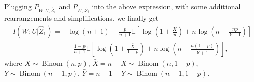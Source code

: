 \documentclass[onecolumn,romanappendices,10pt]{IEEEtran}
\newcommand{\EE}{{\mathbb{E}}}
\DeclareMathOperator{\Binomial}{Binom}
\begin{document}
	Plugging $P_{W, U, \hat{Z}_{i}}$ and $P_{W, \hat{Z}_{i}}$ into the above expression, with some additional rearrangements and simplifications, we finally get
	\begin{equation}
		\begin{aligned}
			I\left( W; U | \hat{Z}_{1} \right) =& \log (n + 1) - \frac{p}{n + 1} \EE \left[ \log \left( 1 + \frac{X}{p} \right) + n \log \left( n + \frac{n p}{Y + 1} \right) \right] \\
			&- \frac{1 - p}{n + 1} \EE \left[ \log \left( 1 + \frac{\bar{X}}{1 - p} \right) + n \log \left( n + \frac{n (1 - p)}{\bar{Y} + 1} \right) \right],
		\end{aligned}
		\label{eq:Ber_LOO_SCMI}
	\end{equation}
	where $X \sim \Binomial(n, p)$, $\bar{X} = n - X \sim \Binomial(n, 1 - p)$, $Y \sim \Binomial(n - 1, p)$, $\bar{Y} = n - 1 - Y \sim \Binomial(n - 1, 1 - p)$.
	
\end{document}
